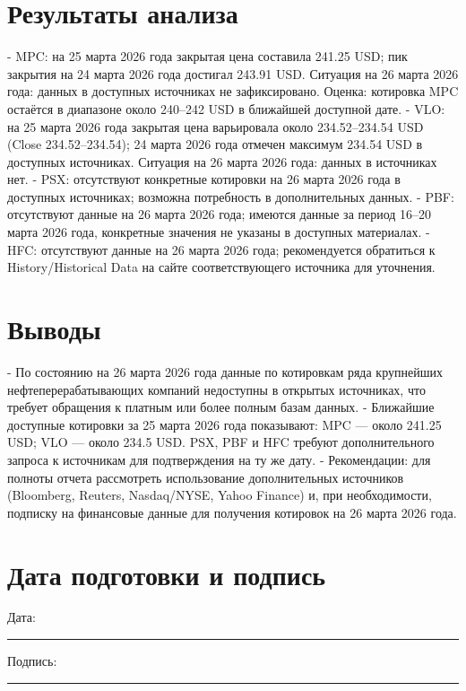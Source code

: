 \documentclass[12pt]{article}
\begin{document}
\section*{Результаты анализа}
- MPC: на 25 марта 2026 года закрытая цена составила 241.25 USD; пик закрытия на 24 марта 2026 года достигал 243.91 USD. Ситуация на 26 марта 2026 года: данных в доступных источниках не зафиксировано. Оценка: котировка MPC остаётся в диапазоне около 240–242 USD в ближайшей доступной дате.
- VLO: на 25 марта 2026 года закрытая цена варьировала около 234.52–234.54 USD (Close 234.52–234.54); 24 марта 2026 года отмечен максимум 234.54 USD в доступных источниках. Ситуация на 26 марта 2026 года: данных в источниках нет.
- PSX: отсутствуют конкретные котировки на 26 марта 2026 года в доступных источниках; возможна потребность в дополнительных данных.
- PBF: отсутствуют данные на 26 марта 2026 года; имеются данные за период 16–20 марта 2026 года, конкретные значения не указаны в доступных материалах.
- HFC: отсутствуют данные на 26 марта 2026 года; рекомендуется обратиться к History/Historical Data на сайте соответствующего источника для уточнения.

\section*{Выводы}
- По состоянию на 26 марта 2026 года данные по котировкам ряда крупнейших нефтеперерабатывающих компаний недоступны в открытых источниках, что требует обращения к платным или более полным базам данных.
- Ближайшие доступные котировки за 25 марта 2026 года показывают: MPC — около 241.25 USD; VLO — около 234.5 USD. PSX, PBF и HFC требуют дополнительного запроса к источникам для подтверждения на ту же дату.
- Рекомендации: для полноты отчета рассмотреть использование дополнительных источников (Bloomberg, Reuters, Nasdaq/NYSE, Yahoo Finance) и, при необходимости, подписку на финансовые данные для получения котировок на 26 марта 2026 года.

\section*{Дата подготовки и подпись}
Дата: \rule{5cm}{0.4pt} \hfill Подпись: \rule{5cm}{0.4pt}
\end{document}
